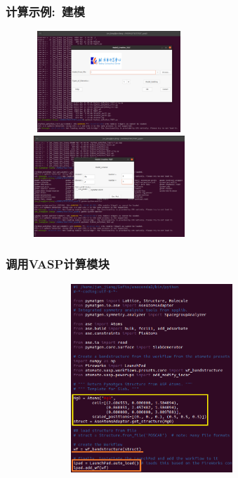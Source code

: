 \begin{frame}
	\frametitle{计算示例:~建模}
\begin{figure}[h!]
\centering
\vskip -15pt
\includegraphics[height=1.50in,width=2.23in,viewport=0 0 1200 870,clip]{Figures/BCC-Process_1.png}
\includegraphics[height=1.50in]{Figures/BCC-Process_2.png}
\label{MP_comp_BCC_2}
\end{figure}
\end{frame}

\frame
{
	\frametitle{调用\textrm{VASP}计算模块}
\begin{figure}[h!]
\centering
\vspace*{-0.2in}
\includegraphics[height=2.8in,width=3.5in,viewport=0 0 470 400,clip]{Figures/Atomate-ASE_MgO.png}
\label{Atomate-ASE_app}
\end{figure} 
}

